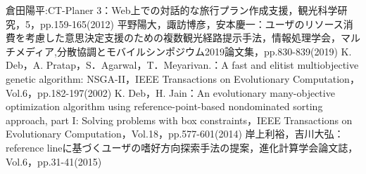 \begin{thebibliography}{99}
 倉田陽平:CT-Planer 3：Web上での対話的な旅行プラン作成支援，観光科学研究，5，pp.159-165(2012)
 平野陽大，諏訪博彦，安本慶一：ユーザのリソース消費を考慮した意思決定支援のための複数観光経路提示手法，情報処理学会，マルチメディア,分散協調とモバイルシンポジウム2019論文集，pp.830-839(2019)
 K. Deb，A. Pratap，S．Agarwal，T．Meyarivan.：A fast and elitist multiobjective genetic algorithm: NSGA-I\hspace{-.1em}I，IEEE Transactions on Evolutionary Computation，Vol.6，pp.182-197(2002)
 K. Deb，H. Jain：An evolutionary many-objective optimization algorithm using reference-point-based nondominated sorting approach, part I: Solving problems with box constraints，IEEE Transactions on Evolutionary Computation，Vol.18，pp.577-601(2014)
 岸上利裕，吉川大弘：reference lineに基づくユーザの嗜好方向探索手法の提案，進化計算学会論文誌，Vol.6，pp.31-41(2015)
\end{thebibliography}

%
%
